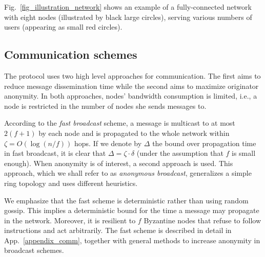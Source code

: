 Fig.~\ref{fig_illustration_network} shows an example of a fully-connected \name network with eight nodes (illustrated by black large circles), serving various numbers of users (appearing as small red circles). 

\subsection{Communication schemes}
\label{communication_schemes}
The protocol uses two high level approaches for communication. The first aims to reduce message dissemination time 
while the second aims to maximize originator anonymity. 
In both approaches, nodes' bandwidth consumption is limited, i.e., a node is restricted in the number of nodes she sends messages to.

According to the \emph{fast broadcast} scheme, a message is multicast to at most $2 (f+1)$ by each node and is propagated to the whole network within $\zeta=O(\log({n/f}))$ hops. If we denote by $\Delta$ the bound over propagation time in fast broadcast, it is clear that $\Delta=\zeta\cdot\delta$ (under the assumption that $f$ is small enough).
When anonymity is of interest, a second approach is used. This approach, which we shall refer to as \emph{anonymous broadcast}, generalizes a simple ring topology and uses different heuristics.

We emphasize that the fast scheme is deterministic rather than using random gossip. This implies a deterministic bound for the time a message may propagate in the network. Moreover, it is resilient to $f$ Byzantine nodes that refuse to follow instructions and act arbitrarily. The fast scheme is described in detail in App.~\ref{appendix_comm}, together with general methods to increase anonymity in broadcast schemes.
